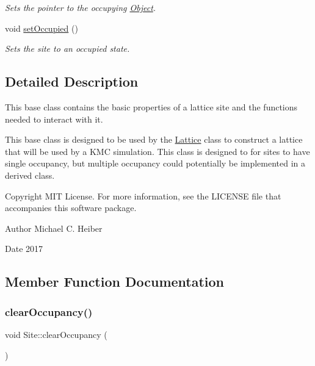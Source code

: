 \begin{DoxyCompactItemize}
\begin{DoxyCompactList}\small\item\em Sets the pointer to the occupying \hyperlink{class_object}{Object}. \end{DoxyCompactList}\item 
\mbox{\label{class_site_ab85bec20c3a6067a7dca659221d57d25}} 
void \hyperlink{class_site_ab85bec20c3a6067a7dca659221d57d25}{set\+Occupied} ()
\begin{DoxyCompactList}\small\item\em Sets the site to an occupied state. \end{DoxyCompactList}\end{DoxyCompactItemize}


\subsection{Detailed Description}
This base class contains the basic properties of a lattice site and the functions needed to interact with it. 

This base class is designed to be used by the \hyperlink{class_lattice}{Lattice} class to construct a lattice that will be used by a K\+MC simulation. This class is designed to for sites to have single occupancy, but multiple occupancy could potentially be implemented in a derived class. \begin{DoxyCopyright}{Copyright}
M\+IT License. For more information, see the L\+I\+C\+E\+N\+SE file that accompanies this software package. 
\end{DoxyCopyright}
\begin{DoxyAuthor}{Author}
Michael C. Heiber 
\end{DoxyAuthor}
\begin{DoxyDate}{Date}
2017 
\end{DoxyDate}


\subsection{Member Function Documentation}
\mbox{\label{class_site_a46ff077954e39046b493ee1ea57a9c93}} 
\subsubsection{\texorpdfstring{clear\+Occupancy()}{clearOccupancy()}}
{\footnotesize\ttfamily void Site\+::clear\+Occupancy (\begin{DoxyParamCaption}{ }\end{DoxyParamCaption})}



